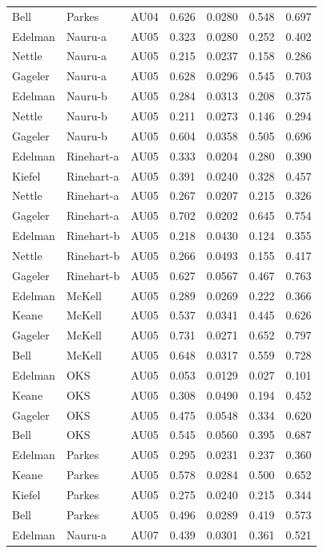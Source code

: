 \documentclass{monashthesis}
\begin{document}
\begin{center}
\begin{longtable}{lllllll}
Bell & Parkes & AU04 & 0.626 & 0.0280 & 0.548 & 0.697 \\
Edelman & Nauru-a & AU05 & 0.323 & 0.0280 & 0.252 & 0.402 \\
Nettle & Nauru-a & AU05 & 0.215 & 0.0237 & 0.158 & 0.286 \\
Gageler & Nauru-a & AU05 & 0.628 & 0.0296 & 0.545 & 0.703 \\
Edelman & Nauru-b & AU05 & 0.284 & 0.0313 & 0.208 & 0.375 \\
Nettle & Nauru-b & AU05 & 0.211 & 0.0273 & 0.146 & 0.294 \\
Gageler & Nauru-b & AU05 & 0.604 & 0.0358 & 0.505 & 0.696 \\
Edelman & Rinehart-a & AU05 & 0.333 & 0.0204 & 0.280 & 0.390 \\
Kiefel & Rinehart-a & AU05 & 0.391 & 0.0240 & 0.328 & 0.457 \\
Nettle & Rinehart-a & AU05 & 0.267 & 0.0207 & 0.215 & 0.326 \\
Gageler & Rinehart-a & AU05 & 0.702 & 0.0202 & 0.645 & 0.754 \\
Edelman & Rinehart-b & AU05 & 0.218 & 0.0430 & 0.124 & 0.355 \\
Nettle & Rinehart-b & AU05 & 0.266 & 0.0493 & 0.155 & 0.417 \\
Gageler & Rinehart-b & AU05 & 0.627 & 0.0567 & 0.467 & 0.763 \\
Edelman & McKell & AU05 & 0.289 & 0.0269 & 0.222 & 0.366 \\
Keane & McKell & AU05 & 0.537 & 0.0341 & 0.445 & 0.626 \\
Gageler & McKell & AU05 & 0.731 & 0.0271 & 0.652 & 0.797 \\
Bell & McKell & AU05 & 0.648 & 0.0317 & 0.559 & 0.728 \\
Edelman & OKS & AU05 & 0.053 & 0.0129 & 0.027 & 0.101 \\
Keane & OKS & AU05 & 0.308 & 0.0490 & 0.194 & 0.452 \\
Gageler & OKS & AU05 & 0.475 & 0.0548 & 0.334 & 0.620 \\
Bell & OKS & AU05 & 0.545 & 0.0560 & 0.395 & 0.687 \\
Edelman & Parkes & AU05 & 0.295 & 0.0231 & 0.237 & 0.360 \\
Keane & Parkes & AU05 & 0.578 & 0.0284 & 0.500 & 0.652 \\
Kiefel & Parkes & AU05 & 0.275 & 0.0240 & 0.215 & 0.344 \\
Bell & Parkes & AU05 & 0.496 & 0.0289 & 0.419 & 0.573 \\
Edelman & Nauru-a & AU07 & 0.439 & 0.0301 & 0.361 & 0.521 \\

\end{longtable}
\end{center}
\end{document}
